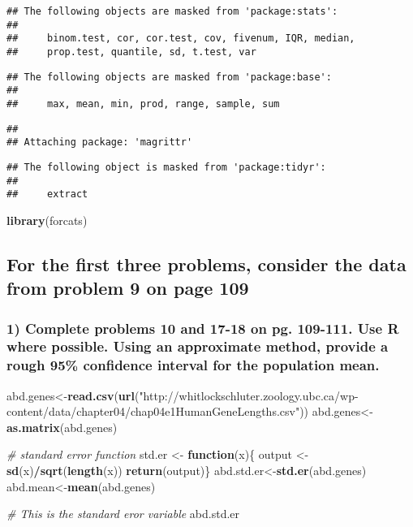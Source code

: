\documentclass[]{article}
\newenvironment{Shaded}{\begin{snugshade}}{\end{snugshade}}
\newcommand{\KeywordTok}[1]{\textcolor[rgb]{0.13,0.29,0.53}{\textbf{#1}}}
\newcommand{\StringTok}[1]{\textcolor[rgb]{0.31,0.60,0.02}{#1}}
\newcommand{\CommentTok}[1]{\textcolor[rgb]{0.56,0.35,0.01}{\textit{#1}}}
\newcommand{\ControlFlowTok}[1]{\textcolor[rgb]{0.13,0.29,0.53}{\textbf{#1}}}
\newcommand{\OperatorTok}[1]{\textcolor[rgb]{0.81,0.36,0.00}{\textbf{#1}}}
\newcommand{\NormalTok}[1]{#1}
\begin{document}
\begin{verbatim}
## The following objects are masked from 'package:stats':
## 
##     binom.test, cor, cor.test, cov, fivenum, IQR, median,
##     prop.test, quantile, sd, t.test, var
\end{verbatim}

\begin{verbatim}
## The following objects are masked from 'package:base':
## 
##     max, mean, min, prod, range, sample, sum
\end{verbatim}

\begin{verbatim}
## 
## Attaching package: 'magrittr'
\end{verbatim}

\begin{verbatim}
## The following object is masked from 'package:tidyr':
## 
##     extract
\end{verbatim}

\begin{Shaded}
\begin{Highlighting}[]
\KeywordTok{library}\NormalTok{(forcats)}
\end{Highlighting}
\end{Shaded}

\subsection{For the first three problems, consider the data from problem
9 on page
109}\label{for-the-first-three-problems-consider-the-data-from-problem-9-on-page-109}

\subsubsection{1) Complete problems 10 and 17-18 on pg. 109-111. Use R
where possible. Using an approximate method, provide a rough 95\%
confidence interval for the population
mean.}\label{complete-problems-10-and-17-18-on-pg.-109-111.-use-r-where-possible.-using-an-approximate-method-provide-a-rough-95-confidence-interval-for-the-population-mean.}

\begin{Shaded}
\begin{Highlighting}[]
\NormalTok{abd.genes<-}\KeywordTok{read.csv}\NormalTok{(}\KeywordTok{url}\NormalTok{(}\StringTok{"http://whitlockschluter.zoology.ubc.ca/wp-content/data/chapter04/chap04e1HumanGeneLengths.csv"}\NormalTok{))}
\NormalTok{abd.genes<-}\KeywordTok{as.matrix}\NormalTok{(abd.genes)}

\CommentTok{# standard error function}
\NormalTok{std.er <-}\StringTok{ }\ControlFlowTok{function}\NormalTok{(x)\{}
\NormalTok{  output <-}\KeywordTok{sd}\NormalTok{(x)}\OperatorTok{/}\KeywordTok{sqrt}\NormalTok{(}\KeywordTok{length}\NormalTok{(x))}
  \KeywordTok{return}\NormalTok{(output)\}}
\NormalTok{abd.std.er<-}\KeywordTok{std.er}\NormalTok{(abd.genes)}
\NormalTok{abd.mean<-}\KeywordTok{mean}\NormalTok{(abd.genes)}

\CommentTok{# This is the standard eror variable}
\NormalTok{abd.std.er}
\end{Highlighting}
\end{Shaded}
\end{document}
